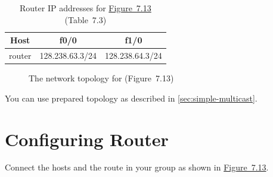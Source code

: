 \documentclass{UTNetLab}
\begin{document}
    \begin{table}[H]
        \caption{Router IP addresses for \hyperref[fig:7.13]{Figure~7.13} (Table~7.3)}
        \label{tab:7.3}
        \centering
        \begin{tabular}{ *3c }
            \hline \hline
            Host & f0/0 & f1/0 \\
            \hline
            router & 128.238.63.3/24 & 128.238.64.3/24 \\
            \hline \hline
            \end{tabular}
    \end{table}

    \begin{figure}[H]
        \centering
        \caption{The network topology for  (Figure~7.13)}
        \label{fig:7.13}
    \end{figure}


    You can use prepared topology as described in \autoref{sec:simple-multicast}.

\section{Configuring Router}
\label{sec:config-router}
    Connect the hosts and the route in your group as shown in \hyperref[fig:7.13]{Figure~7.13}.
    
\end{document}
